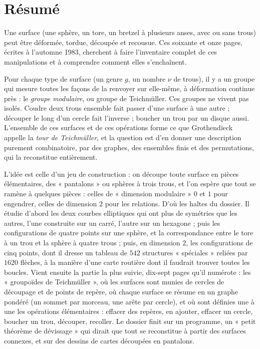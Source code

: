 \documentclass[11pt,a4paper]{article}
\begin{document}
\section*{Résumé}

\begin{resume}
Une surface (une sphère, un tore, un bretzel à plusieurs anses, avec ou sans
trous) peut être déformée, tordue, découpée et recousue. Ces soixante et onze
pages, écrites à l'automne 1983, cherchent à faire l'inventaire complet de ces
manipulations et à comprendre comment elles s'enchaînent.

Pour chaque type de surface (un genre $g$, un
nombre $\nu$ de trous), il y a un groupe qui mesure toutes les façons de la
renvoyer sur elle-même, à déformation continue près : le \emph{groupe
modulaire}, ou groupe de Teichmüller. Ces groupes ne vivent pas isolés. Coudre
deux trous ensemble fait passer d'une surface à une autre ; découper le long
d'un cercle fait l'inverse ; boucher un trou par un disque aussi. L'ensemble de
ces surfaces et de ces opérations forme ce que Grothendieck appelle la
\emph{tour de Teichmüller}, et la question est d'en donner une description
purement combinatoire, par des graphes, des ensembles finis et des
permutations, qui la reconstitue entièrement.

L'idée est celle d'un jeu de construction : on découpe toute surface
en pièces élémentaires, des « pantalons » ou sphères à trois trous, et l'on
espère que tout se ramène à quelques pièces : celles de « dimension modulaire »
$0$ et $1$ pour engendrer, celles de dimension $2$ pour les relations. D'où les
haltes du dossier. Il étudie d'abord les deux courbes elliptiques qui ont plus
de symétries que les autres, l'une construite sur un carré, l'autre sur un
hexagone ; puis les configurations de quatre points sur une sphère, et la
correspondance entre le tore à un trou et la sphère à quatre trous ; puis, en
dimension $2$, les configurations de cinq points, dont il dresse un tableau de
$542$ structures « spéciales » reliées par $1620$ flèches, à la manière d'une
carte routière dont il faudrait trouver toutes les boucles. Vient ensuite la
partie la plus suivie, dix-sept pages qu'il numérote : les « groupoïdes de
Teichmüller », où les surfaces sont munies de cercles de découpage et de points
de repère, où chaque surface se résume en un graphe pondéré (un sommet par
morceau, une arête par cercle), et où sont définies une à une les opérations
élémentaires : effacer des repères, en ajouter, effacer un cercle, boucher un
trou, découper, recoller. Le dossier finit sur un programme, un « petit
théorème de dévissage » qui dirait que tout se reconstitue à partir des
surfaces connexes, et sur des dessins de cartes découpées en pantalons.


\end{resume}
\end{document}
